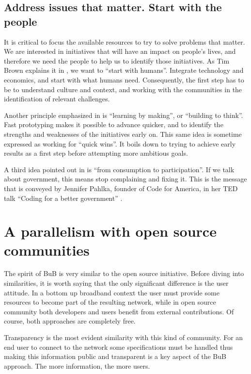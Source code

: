 \documentclass[draftclsnofoot,12pt,journal,onecolumn]{IEEEtran}
\begin{document}
\subsection{Address issues that matter. Start with the people}

It is critical to focus the available resources to try to solve problems that matter.
We are interested in initiatives that will have an impact on people's lives, and therefore we need the people to help us to identify those initiatives.
As Tim Brown explains it in \cite{brown2009ted}, we want to ``start with humans''.
Integrate technology and economics, and start with what humans need.
Consequently, the first step has to be to understand culture and context, and working with the communities in the identification of relevant challenges.

Another principle emphasized in \cite{brown2009ted} is ``learning by making'', or ``building to think''.
Fast prototyping makes it possible to advance quicker, and to identify the strengths and weaknesses of the initiatives early on.
This same idea is sometime expressed as working for ``quick wins''.
It boils down to trying to achieve early results as a first step before attempting more ambitious goals.

A third idea pointed out in \cite{brown2009ted} is ``from consumption to participation''.
If we talk about government, this means stop complaining and fixing it.
This is the message that is conveyed by Jennifer Pahlka, founder of Code for America, in her TED talk ``Coding for a better government'' \cite{pahlka2012ted}.


\section{A parallelism with open source communities}
\label{sec:open-source}

The spirit of BuB is very similar to the open source initiative. Before diving into similarities, it is worth saying that the only significant difference is the user attitude. In a bottom up broadband context the user must provide some resources to become part of the resulting network, while in open source community both developers and users benefit from external contributions. Of course, both approaches are completely free.

Transparency is the most evident similarity with this kind of community. For an end user to connect to the network some specifications must be handled thus making this information public and transparent is a key aspect of the BuB approach. The more information, the more users. 
\end{document}
